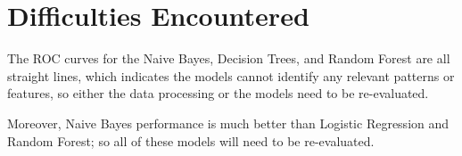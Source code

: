 \section{Difficulties Encountered}

The ROC curves for the Naive Bayes, Decision Trees, and Random Forest are all straight lines, which indicates the models cannot identify any relevant patterns or features, so either the data processing or the models need to be re-evaluated.

Moreover, Naive Bayes performance is much better than Logistic Regression and Random Forest; so all of these models will need to be re-evaluated.
